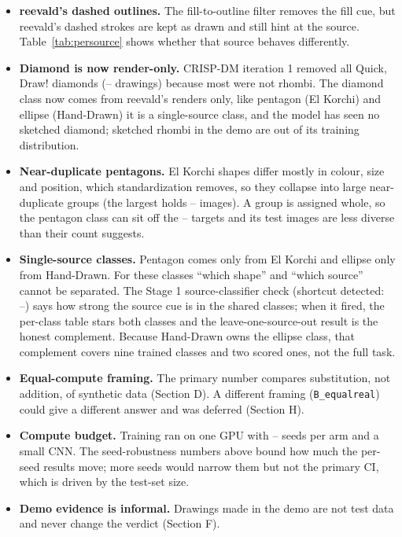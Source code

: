\documentclass[11pt]{article}
\providecommand{\LargestNearDupGroup}{--}
\providecommand{\ExcludedByRule}{--}
\providecommand{\SeedsPerArm}{--}
\providecommand{\SplitRatios}{--}
\providecommand{\ShortcutDetected}{--}
\begin{document}
\begin{itemize}
  \item \textbf{reevald's dashed outlines.} The fill-to-outline filter removes
        the fill cue, but reevald's dashed strokes are kept as drawn and still
        hint at the source. Table~\ref{tab:persource} shows whether that
        source behaves differently.
  \item \textbf{Diamond is now render-only.} CRISP-DM iteration 1 removed all
        Quick, Draw! diamonds (\ExcludedByRule{} drawings) because most were
        not rhombi. The diamond class now comes from reevald's renders only,
        like pentagon (El Korchi) and ellipse (Hand-Drawn) it is a
        single-source class, and the model has seen no sketched diamond;
        sketched rhombi in the demo are out of its training distribution.
  \item \textbf{Near-duplicate pentagons.} El Korchi shapes differ mostly in
        colour, size and position, which standardization removes, so they
        collapse into large near-duplicate groups (the largest holds
        \LargestNearDupGroup{} images). A group is assigned whole, so the
        pentagon class can sit off the \SplitRatios{} targets and its test
        images are less diverse than their count suggests.
  \item \textbf{Single-source classes.} Pentagon comes only from El Korchi and
        ellipse only from Hand-Drawn. For these classes ``which shape'' and
        ``which source'' cannot be separated. The Stage 1 source-classifier
        check (shortcut detected: \ShortcutDetected) says how strong the source
        cue is in the shared classes; when it fired, the per-class table stars
        both classes and the leave-one-source-out result is the honest
        complement. Because Hand-Drawn owns the ellipse class, that complement
        covers nine trained classes and two scored ones, not the full task.
  \item \textbf{Equal-compute framing.} The primary number compares
        substitution, not addition, of synthetic data (Section D). A
        different framing (\texttt{B\_equalreal}) could give a different
        answer and was deferred (Section H).
  \item \textbf{Compute budget.} Training ran on one GPU with \SeedsPerArm{} seeds
        per arm and a small CNN. The seed-robustness numbers above bound how
        much the per-seed results move; more seeds would narrow them but not
        the primary CI, which is driven by the test-set size.
  \item \textbf{Demo evidence is informal.} Drawings made in the demo are not
        test data and never change the verdict (Section F).
\end{itemize}
\end{document}
